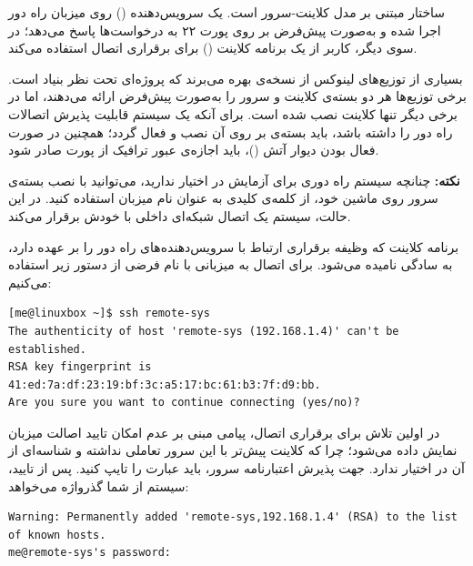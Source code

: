 ساختار  مبتنی بر مدل کلاینت-سرور است. یک سرویس‌دهنده () روی میزبان راه دور اجرا شده و به‌صورت پیش‌فرض بر روی پورت ۲۲ به درخواست‌ها پاسخ می‌دهد؛ در سوی دیگر، کاربر از یک برنامه کلاینت () برای برقراری اتصال استفاده می‌کند.

بسیاری از توزیع‌های لینوکس از نسخه‌ی  بهره می‌برند که پروژه‌ای تحت نظر بنیاد  است. برخی توزیع‌ها هر دو بسته‌ی کلاینت و سرور را به‌صورت پیش‌فرض ارائه می‌دهند، اما در برخی دیگر تنها کلاینت نصب شده است. برای آنکه یک سیستم قابلیت پذیرش اتصالات راه دور را داشته باشد، باید بسته‌ی  بر روی آن نصب و فعال گردد؛ همچنین در صورت فعال بودن دیوار آتش ()، باید اجازه‌ی عبور ترافیک از پورت  صادر شود.

\begin{note}
\textbf{نکته:} چنانچه سیستم راه دوری برای آزمایش در اختیار ندارید، می‌توانید با نصب بسته‌ی سرور روی ماشین خود، از کلمه‌ی کلیدی  به عنوان نام میزبان استفاده کنید. در این حالت، سیستم یک اتصال شبکه‌ای داخلی با خودش برقرار می‌کند.
\end{note}

برنامه کلاینت که وظیفه برقراری ارتباط با سرویس‌دهنده‌های راه دور را بر عهده دارد، به سادگی  نامیده می‌شود. برای اتصال به میزبانی با نام فرضی  از دستور زیر استفاده می‌کنیم:

\begin{latin}
\begin{lstlisting}
[me@linuxbox ~]$ ssh remote-sys
The authenticity of host 'remote-sys (192.168.1.4)' can't be established.
RSA key fingerprint is
41:ed:7a:df:23:19:bf:3c:a5:17:bc:61:b3:7f:d9:bb.
Are you sure you want to continue connecting (yes/no)?
\end{lstlisting}
\end{latin}

در اولین تلاش برای برقراری اتصال، پیامی مبنی بر عدم امکان تایید اصالت میزبان نمایش داده می‌شود؛ چرا که کلاینت پیش‌تر با این سرور تعاملی نداشته و شناسه‌ای از آن در اختیار ندارد. جهت پذیرش اعتبارنامه سرور، باید عبارت  را تایپ کنید. پس از تایید، سیستم از شما گذرواژه می‌خواهد:

\begin{latin}
\begin{lstlisting}
Warning: Permanently added 'remote-sys,192.168.1.4' (RSA) to the list of known hosts.
me@remote-sys's password:
\end{lstlisting}
\end{latin}

